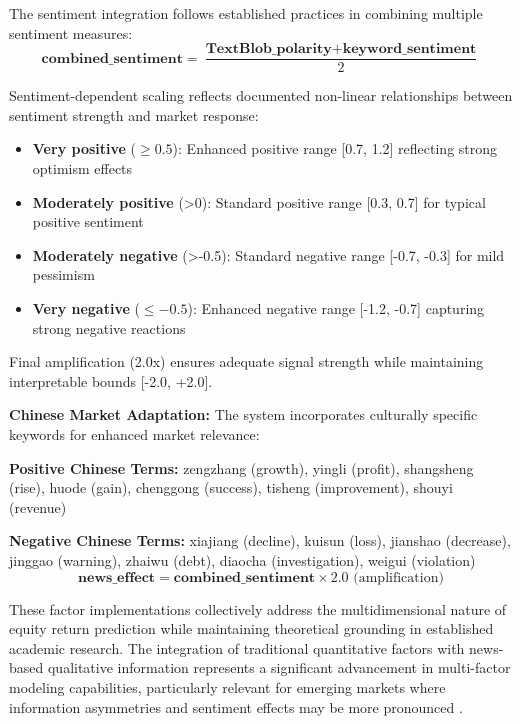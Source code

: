 \documentclass[3p,times,procedia]{elsarticle}
\begin{document}
The sentiment integration follows established practices in combining multiple sentiment measures:
\begin{equation}
    \textbf{combined\_sentiment} = \frac{\textbf{TextBlob\_polarity} + \textbf{keyword\_sentiment}}{2}
\end{equation}
\vspace{0.2cm}

Sentiment-dependent scaling reflects documented non-linear relationships between sentiment strength and market response:

\begin{itemize}
    \item \textbf{Very positive} ($\geq 0.5$): Enhanced positive range [0.7, 1.2] reflecting strong optimism effects
    \item \textbf{Moderately positive} (>0): Standard positive range [0.3, 0.7] for typical positive sentiment
    \item \textbf{Moderately negative} (>-0.5): Standard negative range [-0.7, -0.3] for mild pessimism
    \item \textbf{Very negative} ($\leq -0.5$): Enhanced negative range [-1.2, -0.7] capturing strong negative reactions
\end{itemize}

Final amplification (2.0x) ensures adequate signal strength while maintaining interpretable bounds [-2.0, +2.0].

\textbf{Chinese Market Adaptation:} The system incorporates culturally specific keywords for enhanced market relevance:

\textbf{Positive Chinese Terms:} zengzhang (growth), yingli (profit), shangsheng (rise), huode (gain), chenggong (success), tisheng (improvement), shouyi (revenue)

\textbf{Negative Chinese Terms:} xiajiang (decline), kuisun (loss), jianshao (decrease), jinggao (warning), zhaiwu (debt), diaocha (investigation), weigui (violation)
\vspace{-0.1cm}
\begin{equation}
\textbf{news\_effect} = \textbf{combined\_sentiment} \times 2.0 \text{ (amplification)}
\end{equation}

These factor implementations collectively address the multidimensional nature of equity return prediction while maintaining theoretical grounding in established academic research. The integration of traditional quantitative factors with news-based qualitative information represents a significant advancement in multi-factor modeling capabilities, particularly relevant for emerging markets where information asymmetries and sentiment effects may be more pronounced \cite{Harvey2016}.
\end{document}
